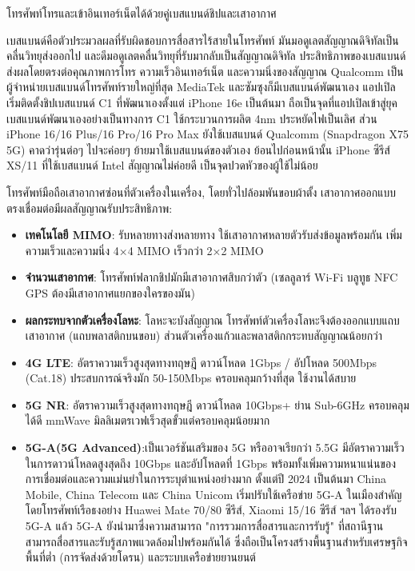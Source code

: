 
โทรศัพท์โทรและเข้าอินเทอร์เน็ตได้ด้วยคู่เบสแบนด์ชิปและเสาอากาศ


เบสแบนด์คือตัวประมวลผลที่รับผิดชอบการสื่อสารไร้สายในโทรศัพท์ มันมอดูเลตสัญญาณดิจิทัลเป็นคลื่นวิทยุส่งออกไป และดีมอดูเลตคลื่นวิทยุที่รับมากลับเป็นสัญญาณดิจิทัล ประสิทธิภาพของเบสแบนด์ส่งผลโดยตรงต่อคุณภาพการโทร ความเร็วอินเทอร์เน็ต และความนิ่งของสัญญาณ Qualcomm เป็นผู้จำหน่ายเบสแบนด์โทรศัพท์รายใหญ่ที่สุด MediaTek และซัมซุงก็มีเบสแบนด์พัฒนาเอง แอปเปิลเริ่มติดตั้งชิปเบสแบนด์ C1 ที่พัฒนาเองตั้งแต่ iPhone 16e เป็นต้นมา ถือเป็นจุดที่แอปเปิลเข้าสู่ยุคเบสแบนด์พัฒนาเองอย่างเป็นทางการ C1 ใช้กระบวนการผลิต 4nm ประหยัดไฟเป็นเลิศ ส่วน iPhone 16/16 Plus/16 Pro/16 Pro Max ยังใช้เบสแบนด์ Qualcomm (Snapdragon X75 5G) คาดว่ารุ่นต่อๆ ไปจะค่อยๆ ย้ายมาใช้เบสแบนด์ของตัวเอง ย้อนไปก่อนหน้านั้น iPhone ซีรีส์ XS/11 ที่ใช้เบสแบนด์ Intel สัญญาณไม่ค่อยดี เป็นจุดปวดหัวของผู้ใช้ไม่น้อย


โทรศัพท์มือถือเสาอากาศซ่อนที่ตัวเครื่องในเครื่อง, โดยทั่วไปล้อมพันขอบผ้าตั้ง เสาอากาศออกแบบตรงเชื่อมต่อมีผลสัญญาณรับประสิทธิภาพ:

\begin{itemize}
  \item \textbf{เทคโนโลยี MIMO}: รับหลายทางส่งหลายทาง ใช้เสาอากาศหลายตัวรับส่งข้อมูลพร้อมกัน เพิ่มความเร็วและความนิ่ง 4×4 MIMO เร็วกว่า 2×2 MIMO
  \item \textbf{จำนวนเสาอากาศ}: โทรศัพท์ฟลากชิปมักมีเสาอากาศสิบกว่าตัว (เซลลูลาร์ Wi-Fi บลูทูธ NFC GPS ต้องมีเสาอากาศแยกของใครของมัน)
  \item \textbf{ผลกระทบจากตัวเครื่องโลหะ}: โลหะจะบังสัญญาณ โทรศัพท์ตัวเครื่องโลหะจึงต้องออกแบบแถบเสาอากาศ (แถบพลาสติกบนขอบ) ส่วนตัวเครื่องแก้วและพลาสติกกระทบสัญญาณน้อยกว่า
\end{itemize}


\begin{itemize}
  \item \textbf{4G LTE}: อัตราความเร็วสูงสุดทางทฤษฎี ดาวน์โหลด 1Gbps / อัปโหลด 500Mbps (Cat.18) ประสบการณ์จริงมัก 50-150Mbps ครอบคลุมกว้างที่สุด ใช้งานได้สบาย
  \item \textbf{5G NR}: อัตราความเร็วสูงสุดทางทฤษฎี ดาวน์โหลด 10Gbps+ ย่าน Sub-6GHz ครอบคลุมได้ดี mmWave มิลลิเมตรเวฟเร็วสุดขั้วแต่ครอบคลุมน้อยมาก
  \item \textbf{5G-A(5G Advanced)}:เป็นเวอร์ชันเสริมของ 5G หรืออาจเรียกว่า 5.5G มีอัตราความเร็วในการดาวน์โหลดสูงสุดถึง 10Gbps และอัปโหลดที่ 1Gbps พร้อมทั้งเพิ่มความหนาแน่นของการเชื่อมต่อและความแม่นยำในการระบุตำแหน่งอย่างมาก ตั้งแต่ปี 2024 เป็นต้นมา China Mobile, China Telecom และ China Unicom เริ่มปรับใช้เครือข่าย 5G-A ในเมืองสำคัญ โดยโทรศัพท์เรือธงอย่าง Huawei Mate 70/80 ซีรีส์, Xiaomi 15/16 ซีรีส์ ฯลฯ ได้รองรับ 5G-A แล้ว 5G-A ยังนำมาซึ่งความสามารถ "การรวมการสื่อสารและการรับรู้" ที่สถานีฐานสามารถสื่อสารและรับรู้สภาพแวดล้อมไปพร้อมกันได้ ซึ่งถือเป็นโครงสร้างพื้นฐานสำหรับเศรษฐกิจพื้นที่ต่ำ (การจัดส่งด้วยโดรน) และระบบเครือข่ายยานยนต์
\end{itemize}

